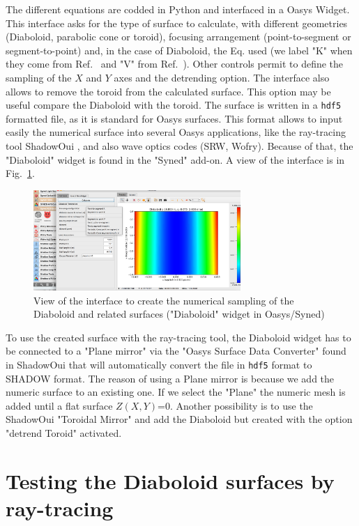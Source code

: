\documentclass{iucr}              %
\begin{document}
The different equations are codded in Python and interfaced in a Oasys Widget. This interface asks for the type of surface to calculate, with different geometries (Diaboloid, parabolic cone or toroid), focusing arrangement (point-to-segment or segment-to-point) and, in the case of Diaboloid, the Eq. used (we label "K" when they come from Ref.~\cite{Goldberg2020} and "V" from Ref.~\cite{Valeriy2020b}). Other controls permit to define the sampling of the $X$ and $Y$ axes and the detrending option. The interface also allows to remove the toroid from the calculated surface. This option may be useful compare the Diaboloid with the toroid. The surface is written in a {\tt hdf5} formatted file, as it is standard for Oasys surfaces. This format allows to input easily the numerical surface into several Oasys applications, like the ray-tracing tool ShadowOui \cite{codeSHADOWOUI}, and also wave optics codes (SRW, Wofry). Because of that, the "Diaboloid" widget is found in the "Syned" add-on. A view of the interface is in Fig.~\ref{fig:widget}.

\begin{figure}[h]
\centering
\includegraphics[width=0.7\textwidth]{figures/widget.png}
\caption{\label{fig:widget}View of the interface to create the numerical sampling of the Diaboloid and related surfaces ("Diaboloid" widget in Oasys/Syned) }
\end{figure}

To use the created surface with the ray-tracing tool, the Diaboloid widget has to be connected to a "Plane mirror" via the "Oasys Surface Data Converter" found in ShadowOui that will automatically convert the file in {\tt hdf5} format to SHADOW format. The reason of using a Plane mirror is because we add the numeric surface to an existing one. If we select the "Plane" the numeric mesh is added until a flat surface $Z(X,Y)$=0. Another possibility is to use the ShadowOui "Toroidal Mirror" and add the Diaboloid but created with the option "detrend Toroid" activated.  

\section{Testing the Diaboloid surfaces by ray-tracing}
\label{sec:testing}
\end{document}
